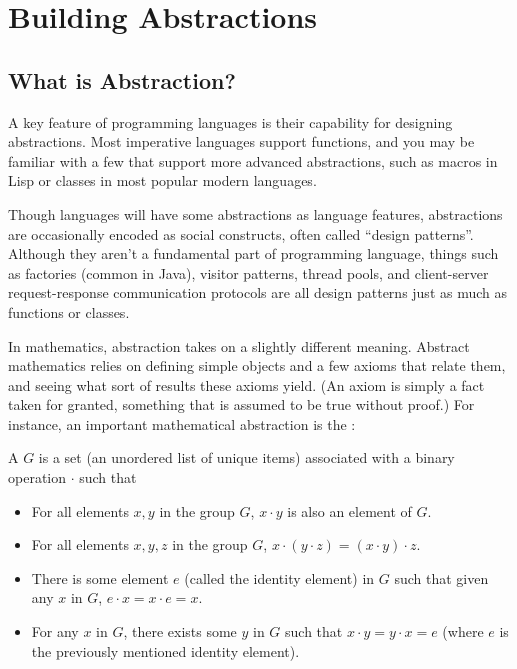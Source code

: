 \chapter{Building Abstractions}
\label{chap:abstraction}


\section{What is Abstraction?}
\label{sec:what-is-abstraction}

A key feature of programming languages is their capability for designing abstractions. Most
imperative languages support functions, and you may be familiar with a few that support more
advanced abstractions, such as macros in Lisp or classes in most popular modern languages.

Though languages will have some abstractions as language features, abstractions are occasionally
encoded as social constructs, often called ``design patterns''.  Although they aren't a fundamental
part of programming language, things such as factories (common in Java), visitor patterns, thread pools,
and client-server request-response communication protocols are all design patterns just as much as
functions or classes.

In mathematics, abstraction takes on a slightly different meaning. Abstract mathematics relies on
defining simple objects and a few axioms that relate them, and seeing what sort of results these
axioms yield. (An axiom is simply a fact taken for granted, something that is assumed to be true
without proof.) For instance, an important mathematical abstraction is the :
\begin{definition}
    A  $G$ is a set (an unordered list of unique items) associated with a binary
    operation $\cdot$ such that
    \begin{itemize}
        \item For all elements $x, y$ in the group $G$, $x \cdot y$ is also an element of $G$.
        \item For all elements $x, y, z$ in the group $G$, $x \cdot (y \cdot z) = (x \cdot y) \cdot z$.
        \item There is some element $e$ (called the identity element) in $G$ such that given any $x$
            in $G$, $e \cdot x = x \cdot e = x$.
        \item For any $x$ in $G$, there exists some $y$ in $G$ such that $x \cdot y = y \cdot x = e$
            (where $e$ is the previously mentioned identity element).
    \end{itemize}
\end{definition}

